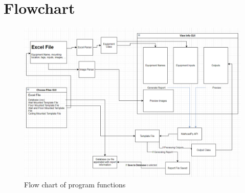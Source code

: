 \documentclass[11pt]{article}
\begin{document}
\section{Flowchart}
\label{sec:org4f1ac1d}
\begin{figure}[htbp]
\centering
\includegraphics[width=.9\linewidth]{./dist/documentation/component_flowchart.png}
\caption{\label{fig:1}Flow chart of program functions}
\end{figure}
\end{document}
